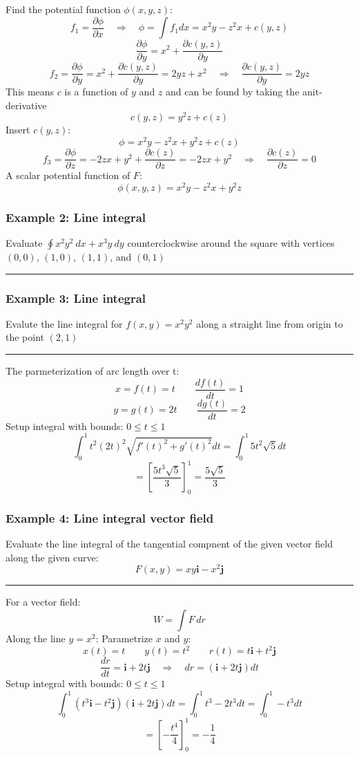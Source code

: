 Find the potential function $\phi(x,y,z)$:
$$f_1=\frac{\partial \phi}{\partial x}\quad\Rightarrow\quad \phi=\int f_1dx=x^2y-z^2x+c(y,z)$$
$$\frac{\partial \phi}{\partial y}=x^2+\frac{\partial c(y,z)}{\partial y}$$
$$f_2=\frac{\partial \phi}{\partial y}=x^2+\frac{\partial c(y,z)}{\partial y}=2yz+x^2\quad\Rightarrow\quad\frac{\partial c(y,z)}{\partial y}=2yz$$ This means $c$ is a function of $y$ and $z$ and can be found by taking the anit-derivative
$$c(y,z)=y^2z+c(z)$$
Insert $c(y,z)$:
$$\phi=x^2y-z^2x+y^2z+c(z)$$
$$f_3=\frac{\partial \phi}{\partial z}=-2zx+y^2+\frac{\partial c(z)}{\partial z}=-2zx+y^2\quad\Rightarrow\quad \frac{\partial c(z)}{\partial z}=0$$
A scalar potential function of $F$:
$$\phi(x,y,z)=x^2y-z^2x+y^2z$$

\subsubsection{Example 2: Line integral}
Evaluate $\oint x^2y^2 \ dx + x^3y\ dy$ counterclockwise around the square with vertices
$(0,0)$, $(1,0)$, $(1, 1)$, and $(0, 1)$

\rule{\textwidth}{1pt}

\subsubsection{Example 3: Line integral}
Evalute the line integral for $f(x,y)=x^2y^2$ along a straight line from origin to the point $(2,1)$

\rule{\textwidth}{1pt}

The parmeterization of arc length over t:
$$x=f(t)=t\qquad \frac{df(t)}{dt}=1$$
$$y=g(t)=2t\qquad \frac{dg(t)}{dt}=2$$
Setup integral with bounds: $0\leq t\leq 1$
$$\int_0^1 t^2(2t)^2\sqrt{f'(t)^2+g'(t)^2}dt=\int_0^1 5t^2\sqrt{5}dt$$
$$=\left[\frac{5t^3\sqrt{5}}{3}\right]^1_0=\frac{5\sqrt{5}}{3}$$

\subsubsection{Example 4: Line integral vector field}
Evaluate the line integral of the tangential compnent of the given vector field along the given curve:
$$F(x,y)=xy\mathbf{i}-x^2\mathbf{j}$$
\rule{\textwidth}{1pt}

For a vector field:
$$W=\int F \,dr$$
Along the line $y=x^2$:
Parametrize $x$ and $y$:
$$x(t)=t\qquad y(t)=t^2\qquad r(t)=t\mathbf{i}+t^2\mathbf{j}$$
$$\frac{dr}{dt}=\mathbf{i}+2t\mathbf{j}\quad\Rightarrow\quad dr=(\mathbf{i}+2t\mathbf{j})dt$$
Setup integral with bounds: $0\leq t\leq 1$
$$\int_{0}^{1}(t^3\mathbf{i}-t^2\mathbf{j})(\mathbf{i}+2t\mathbf{j})  dt=\int_0^1t^3-2t^3dt=\int_0^1-t^3dt$$
$$=\left[-\frac{t^4}{4}\right]_0^1=-\frac{1}{4}$$

